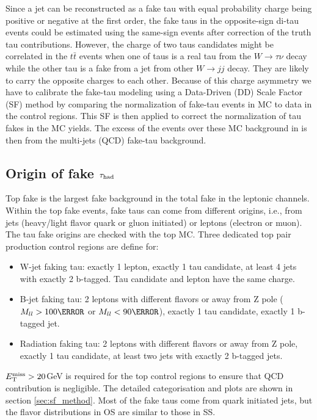 

Since a jet can be reconstructed as a fake tau with equal probability charge being positive or 
negative at the first order, the fake taus in the opposite-sign di-tau events could be estimated using the same-sign events 
after correction of the truth tau contributions. 
However, the charge of two taus candidates might be correlated in the $t\bar t$ events
when one of taus is a real tau from the $W\rightarrow \tau \nu$ decay while the other tau is a fake from a jet from other $W\rightarrow jj$ decay.
They are likely to carry the opposite charges to each other.  
Because of this charge asymmetry we have to calibrate the fake-tau modeling using a Data-Driven (DD) Scale Factor (SF) 
method by comparing the normalization of fake-tau events in MC to data in the control regions.
This SF is then applied to correct the normalization of tau fakes in the MC yields.
The excess of the events over these MC background in is then from the multi-jets (QCD) fake-tau background.

\subsection{Origin of fake $\tau_\text{had}$}
\label{sec:fake_origin}

Top fake is the largest fake background in the total fake in the leptonic channels. 
Within the top fake events, fake taus can come from different origins, i.e., from jets (heavy/light flavor quark or gluon initiated) 
or leptons (electron or muon). The tau fake 
origins are checked with the top MC. Three dedicated top pair production control regions are define for:
\begin{itemize}
\item{W-jet faking tau: exactly 1 lepton, exactly 1 tau candidate, at least 4 jets with exactly 2 b-tagged. Tau candidate and lepton have the same charge.}
\item{B-jet faking tau: 2 leptons with different flavors or away from Z pole ($M_{ll}>100\GeV$ or $M_{ll}<90\GeV$), exactly 1 tau candidate, exactly 1 b-tagged jet.}
\item{Radiation faking tau: 2 leptons with different flavors or away from Z pole, exactly 1 tau candidate, at least two jets with exactly 2 b-tagged jets.}
\end{itemize}
$E_{\text{T}}^{\text{miss}} > 20$GeV is required for the top control regions to ensure that QCD contribution is negligible. The detailed categorisation and plots are shown in section \ref{sec:sf_method}.
Most of the fake taus come from quark initiated jets, but the flavor distributions in OS are similar to those in SS. 

